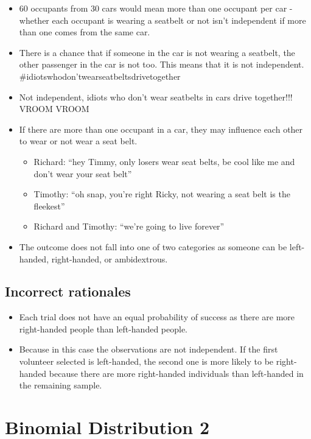 \documentclass[letterpaper,9pt,twoside,printwatermark=false]{pinp}
\providecommand{\tightlist}{%
  \setlength{\itemsep}{0pt}\setlength{\parskip}{0pt}}
\begin{document}
\begin{itemize}
\tightlist
\item
  60 occupants from 30 cars would mean more than one occupant per car -
  whether each occupant is wearing a seatbelt or not isn't independent
  if more than one comes from the same car.
\item
  There is a chance that if someone in the car is not wearing a
  seatbelt, the other passenger in the car is not too. This means that
  it is not independent. \#idiotswhodon'twearseatbeltsdrivetogether
\item
  Not independent, idiots who don't wear seatbelts in cars drive
  together!!! VROOM VROOM
\item
  If there are more than one occupant in a car, they may influence each
  other to wear or not wear a seat belt.

  \begin{itemize}
  \tightlist
  \item
    Richard: ``hey Timmy, only losers wear seat belts, be cool like me
    and don't wear your seat belt''
  \item
    Timothy: ``oh snap, you're right Ricky, not wearing a seat belt is
    the fleekest''
  \item
    Richard and Timothy: ``we're going to live forever''
  \end{itemize}
\item
  The outcome does not fall into one of two categories as someone can be
  left-handed, right-handed, or ambidextrous.
\end{itemize}

\subsection{Incorrect rationales}\label{incorrect-rationales}

\begin{itemize}
\tightlist
\item
  Each trial does not have an equal probability of success as there are
  more right-handed people than left-handed people.
\item
  Because in this case the observations are not independent. If the
  first volunteer selected is left-handed, the second one is more likely
  to be right-handed because there are more right-handed individuals
  than left-handed in the remaining sample.
\end{itemize}

\section{Binomial Distribution 2}\label{binomial-distribution-2}
\end{document}
